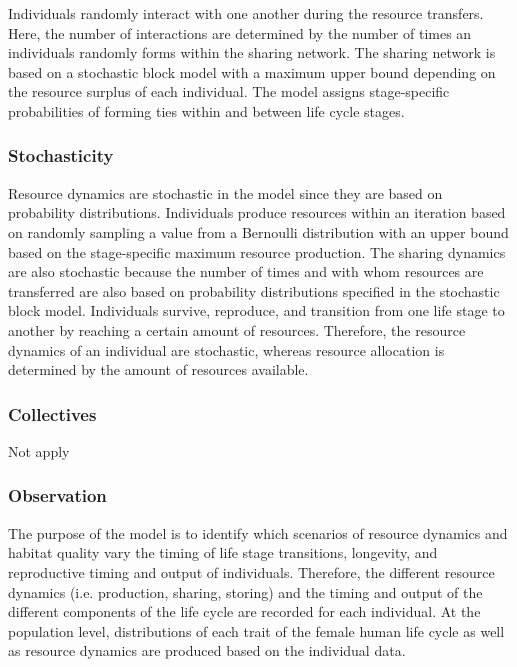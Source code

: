 \documentclass{article}
\begin{document}
Individuals randomly interact with one another during the resource transfers. Here, the number of interactions are determined by the number of times an individuals randomly forms within the sharing network. The sharing network is based on a stochastic block model with a maximum upper bound depending on the resource surplus of each individual. The model assigns stage-specific probabilities of forming ties within and between life cycle stages.

\subsubsection{Stochasticity}

Resource dynamics are stochastic in the model since they are based on probability distributions. Individuals produce resources within an iteration based on randomly sampling a value from a Bernoulli distribution with an upper bound based on the stage-specific maximum resource production. The sharing dynamics are also stochastic because the number of times and with whom resources are transferred are also based on probability distributions specified in the stochastic block model. Individuals survive, reproduce, and transition from one life stage to another by reaching a certain amount of resources. Therefore, the resource dynamics of an individual are stochastic, whereas resource allocation is determined by the amount of resources available.

\subsubsection{Collectives}

Not apply

\subsubsection{Observation}

The purpose of the model is to identify which scenarios of resource dynamics and habitat quality vary the timing of life stage transitions, longevity, and reproductive timing and output of individuals. Therefore, the different resource dynamics (i.e. production, sharing, storing) and the timing and output of the different components of the life cycle are recorded for each individual. At the population level, distributions of each trait of the female human life cycle as well as resource dynamics are produced based on the individual data.
\end{document}
